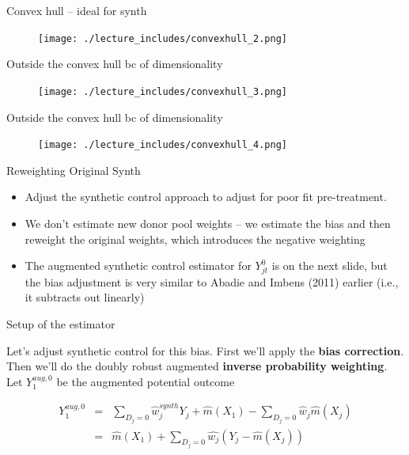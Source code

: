 \documentclass{beamer}
\begin{document}
\begin{frame}{Convex hull -- ideal for synth}

	\begin{figure}
	\texttt{[image: ./lecture\_includes/convexhull\_2.png]}
	\end{figure}

\end{frame}

\begin{frame}{Outside the convex hull bc of dimensionality}

	\begin{figure}
	\texttt{[image: ./lecture\_includes/convexhull\_3.png]}
	\end{figure}

\end{frame}

\begin{frame}{Outside the convex hull bc of dimensionality}

	\begin{figure}
	\texttt{[image: ./lecture\_includes/convexhull\_4.png]}
	\end{figure}

\end{frame}


\begin{frame}{Reweighting Original Synth}
 
\begin{itemize}
\item Adjust the synthetic control approach to adjust for poor fit pre-treatment.
\item We don't estimate new donor pool weights -- we estimate the bias and then reweight the original weights, which introduces the negative weighting
\item The augmented synthetic control estimator for $Y_{jt}^0$ is on the next slide, but the bias adjustment is very similar to Abadie and Imbens (2011) earlier (i.e., it subtracts out linearly)
\end{itemize}


\end{frame}




\begin{frame}{Setup of the estimator}

Let's adjust synthetic control for this bias.  First we'll apply the \textbf{bias correction}.  Then we'll do the doubly robust augmented \textbf{inverse probability weighting}. Let $Y_1^{aug,0}$ be the augmented potential outcome

\begin{eqnarray*}
Y_1^{aug,0} &=& \sum_{D_j=0} \widehat{w}_j^{synth} Y_{j} + \widehat{m}(X_1) - \sum_{D_j=0} \widehat{w}_j \widehat{m}(X_j) \\
&=& \widehat{m}(X_1) + \sum_{D_j=0} \widehat{w_j}(Y_j - \widehat{m}(X_j))
\end{eqnarray*}

\end{frame}
\end{document}
